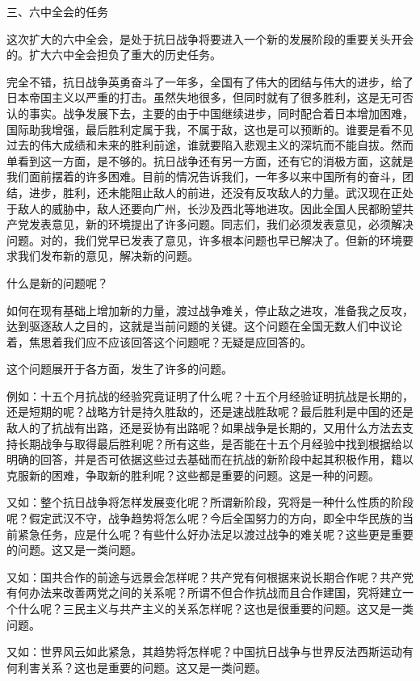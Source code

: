 三、六中全会的任务

这次扩大的六中全会，是处于抗日战争将要进入一个新的发展阶段的重要关头开会的。扩大六中全会担负了重大的历史任务。

完全不错，抗日战争英勇奋斗了一年多，全国有了伟大的团结与伟大的进步，给了日本帝国主义以严重的打击。虽然失地很多，但同时就有了很多胜利，这是无可否认的事实。战争发展下去，主要的由于中国继续进步，同时配合着日本增加困难，国际助我增强，最后胜利定属于我，不属于敌，这也是可以预断的。谁要是看不见过去的伟大成绩和未来的胜利前途，谁就要陷入悲观主义的深坑而不能自拔。然而单看到这一方面，是不够的。抗日战争还有另一方面，还有它的消极方面，这就是我们面前摆着的许多困难。目前的情况告诉我们，一年多以来中国所有的奋斗，团结，进步，胜利，还未能阻止敌人的前进，还没有反攻敌人的力量。武汉现在正处于敌人的威胁中，敌人还要向广州，长沙及西北等地进攻。因此全国人民都盼望共产党发表意见，新的环境提出了许多问题。同志们，我们必须发表意见，必须解决问题。对的，我们党早已发表了意见，许多根本问题也早已解决了。但新的环境要求我们发布新的意见，解决新的问题。

什么是新的问题呢？

如何在现有基础上增加新的力量，渡过战争难关，停止敌之进攻，准备我之反攻，达到驱逐敌人之目的，这就是当前问题的关键。这个问题在全国无数人们中议论着，焦思着我们应不应该回答这个问题呢？无疑是应回答的。

这个问题展开于各方面，发生了许多的问题。

例如：十五个月抗战的经验究竟证明了什么呢？十五个月经验证明抗战是长期的，还是短期的呢？战略方针是持久胜敌的，还是速战胜敌呢？最后胜利是中国的还是敌人的了抗战有出路，还是妥协有出路呢？如果战争是长期的，又用什么方法去支持长期战争与取得最后胜利呢？所有这些，是否能在十五个月经验中找到根据给以明确的回答，并是否可依据这些过去基础而在抗战的新阶段中起其积极作用，籍以克服新的困难，争取新的胜利呢？这些都是重要的问题。这是一种的问题。

又如：整个抗日战争将怎样发展变化呢？所谓新阶段，究将是一种什么性质的阶段呢？假定武汉不守，战争趋势将怎么呢？今后全国努力的方向，即全中华民族的当前紧急任务，应是什么呢？有些什么好办法足以渡过战争的难关呢？这些更是重要的问题。这又是一类问题。

又如：国共合作的前途与远景会怎样呢？共产党有何根据来说长期合作呢？共产党有何办法来改善两党之间的关系呢？所谓不但合作抗战而且合作建国，究将建立一个什么呢？三民主义与共产主义的关系怎样呢？这也是很重要的问题。这又是一类问题。

又如：世界风云如此紧急，其趋势将怎样呢？中国抗日战争与世界反法西斯运动有何利害关系？这也是重要的问题。这又是一类问题。

